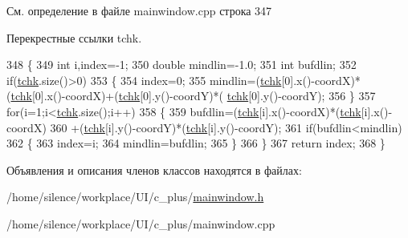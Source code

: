 См. определение в файле mainwindow.\+cpp строка 347



Перекрестные ссылки tchk.


\begin{DoxyCode}
348 \{
349     \textcolor{keywordtype}{int} i,index=-1;
350     \textcolor{keywordtype}{double} mindlin=-1.0;
351     \textcolor{keywordtype}{int} bufdlin;
352     \textcolor{keywordflow}{if}(\hyperlink{classgraph_afae7c6852c8de983693fb2fd108ed3c4}{tchk}.size()>0)
353     \{
354         index=0;
355         mindlin=(\hyperlink{classgraph_afae7c6852c8de983693fb2fd108ed3c4}{tchk}[0].x()-coordX)*(\hyperlink{classgraph_afae7c6852c8de983693fb2fd108ed3c4}{tchk}[0].x()-coordX)+(\hyperlink{classgraph_afae7c6852c8de983693fb2fd108ed3c4}{tchk}[0].y()-coordY)*(
      \hyperlink{classgraph_afae7c6852c8de983693fb2fd108ed3c4}{tchk}[0].y()-coordY);
356     \}
357     \textcolor{keywordflow}{for}(i=1;i<\hyperlink{classgraph_afae7c6852c8de983693fb2fd108ed3c4}{tchk}.size();i++)
358     \{
359         bufdlin=(\hyperlink{classgraph_afae7c6852c8de983693fb2fd108ed3c4}{tchk}[i].x()-coordX)*(\hyperlink{classgraph_afae7c6852c8de983693fb2fd108ed3c4}{tchk}[i].x()-coordX)
360                 +(\hyperlink{classgraph_afae7c6852c8de983693fb2fd108ed3c4}{tchk}[i].y()-coordY)*(\hyperlink{classgraph_afae7c6852c8de983693fb2fd108ed3c4}{tchk}[i].y()-coordY);
361         \textcolor{keywordflow}{if}(bufdlin<mindlin)
362         \{
363             index=i;
364             mindlin=bufdlin;
365         \}
366     \}
367     \textcolor{keywordflow}{return} index;
368 \}
\end{DoxyCode}


Объявления и описания членов классов находятся в файлах\+:\begin{DoxyCompactItemize}
\item 
/home/silence/workplace/\+U\+I/c\+\_\+plus/\hyperlink{mainwindow_8h}{mainwindow.\+h}\item 
/home/silence/workplace/\+U\+I/c\+\_\+plus/mainwindow.\+cpp\end{DoxyCompactItemize}
